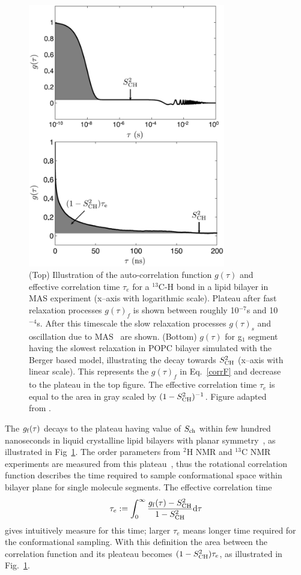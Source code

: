 \documentclass[aps,prl,superscriptaddress,twocolumn]{revtex4}
\begin{document}
\begin{figure}[]
  \includegraphics[width=8.6cm]{../Fig/correlationF.eps}
\newline
  \caption{\label{correlationF}
    (Top) Illustration of the auto-correlation function $g(\tau)$ and effective
    correlation time $\tau_e$ for a $^{13}$C-H bond in a lipid bilayer in MAS experiment (x--axis with logarithmic scale).
    Plateau after fast relaxation processes $g(\tau)_f$ is shown between roughly 10$^{-7}$s and 10$^{-4}$s.
    After this timescale the slow relaxation processes $g(\tau)_s$ and oscillation due to MAS~\cite{nowacka10} are shown.
    (Bottom) $g(\tau)$ for g$_1$ segment having the slowest relaxation in POPC bilayer simulated with the Berger based model,
    illustrating the decay towards $S^2_{{\rm CH}}$ (x--axis with linear scale). 
    This represents the $g(\tau)_f$ in Eq.~\ref{corrF} and decrease to the plateau in the top figure.
    The effective correlation time $\tau_e$ is equal to the area in gray scaled by $(1-S^2_{{\rm CH}})^{-1}$.
    Figure adapted from \cite{ferreira15}.
  } 
\end{figure}

The $g_{\rm{f}}(\tau)$ decays to the plateau having value of $S_{{\rm ch}}$ within few hundred nanoseconds 
in liquid crystalline lipid bilayers with planar symmetry~\cite{ferreira15}, as illustrated in Fig~\ref{correlationF}. 
The order parameters from $^2$H NMR and $^{13}$C NMR experiments are measured from this plateau~\cite{ferreira15},
thus the rotational correlation function describes the time required to sample conformational space 
within bilayer plane for single molecule segments. The effective correlation time~\cite{Lipari82}
\begin{equation}\label{effCTdef}
\tau_{e}:=\int_0^{\infty} \frac{g_{\rm{f}}(\tau)-S_{\rm{CH}}^2}{1-S_{\rm{CH}}^2} \mathrm{d}\tau
\end{equation} 
gives intuitively measure for this time; larger $\tau_e$ means longer time required for the conformational sampling.
With this definition the area between the correlation function and its pleateau becomes $(1-S_{\rm{CH}}^2)\tau_{e}$, 
as illustrated in Fig.~\ref{correlationF}.
\end{document}
